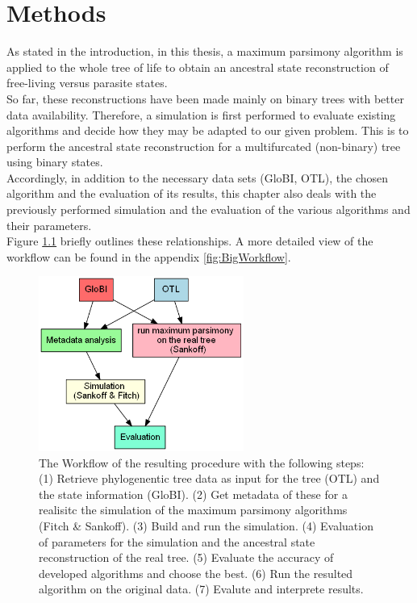 \chapter{Methods}
  As stated in the introduction, in this thesis, a maximum parsimony algorithm is applied to the 
    whole tree of life to obtain an ancestral state reconstruction of free-living versus parasite 
    states. \\
  So far, these reconstructions have been made mainly on binary trees with better data availability. 
    Therefore, a simulation is first performed to evaluate existing algorithms and decide how they 
    may be adapted to our given problem. This is to perform the ancestral state reconstruction for a 
    multifurcated (non-binary) tree using binary states. \\
  Accordingly, in addition to the necessary data sets (GloBI, OTL), the chosen algorithm and the 
    evaluation of its results, this chapter also deals with the previously performed simulation and 
    the evaluation of the various algorithms and their parameters. \\
  Figure \ref{fig:workflow} briefly outlines these relationships. A more detailed view of the 
    workflow can be found in the appendix \ref{fig:BigWorkflow}.
  \begin{figure}[h!]
    \centering
    \includegraphics[width=0.6\textwidth]{Figures/Workflow-overview.png}
    \caption{The Workflow of the resulting procedure with the following steps: \\
      (1) Retrieve phylogenentic tree data as input for the tree (OTL) and the state information (GloBI).
      (2) Get metadata of these for a realisitc the simulation of the maximum parsimony algorithms (Fitch \& Sankoff).
      (3) Build and run the simulation.
      (4) Evaluation of parameters for the simulation and the ancestral state reconstruction of the real tree.
      (5) Evaluate the accuracy of developed algorithms and choose the best.
      (6) Run the resulted algorithm on the original data.
      (7) Evalute and interprete results. %
    }
    \label{fig:workflow}
  \end{figure}
  
